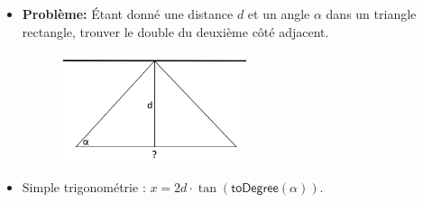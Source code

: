 \begin{frame}
    \frametitle{\problemtitle}
    \begin{itemize}
        \item<+-> \textbf{Problème:} Étant donné une distance $d$ et un angle $\alpha$ dans un triangle rectangle, trouver le double du deuxième côté adjacent.
        \begin{figure}
            \centering
            \includegraphics[width=5.5cm]{sol_mirror.jpg}
       \end{figure}
        \item<+-> Simple trigonométrie : $x=2d\cdot\tan(\mathsf{toDegree}(\alpha))$.
    \end{itemize}
\end{frame}
